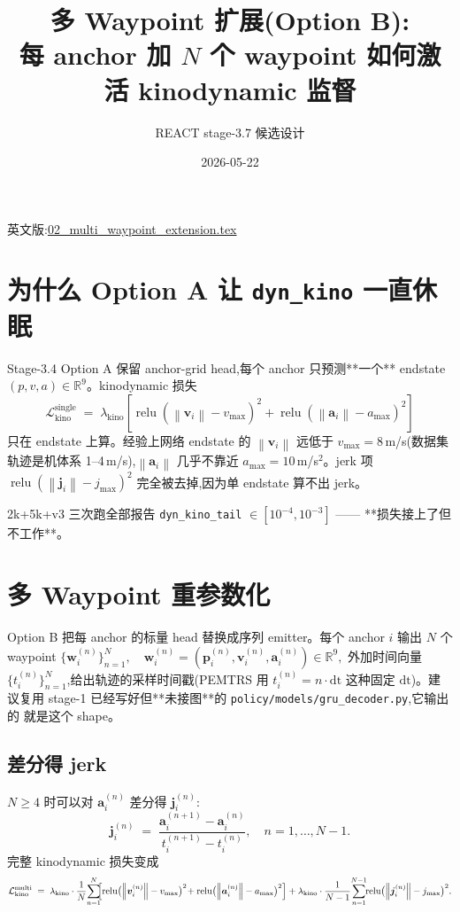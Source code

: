 \documentclass[UTF8, 11pt]{ctexart}
\title{多 Waypoint 扩展(Option B):\\
       每 anchor 加 $N$ 个 waypoint 如何激活 kinodynamic 监督}
\author{REACT stage-3.7 候选设计}
\date{2026-05-22}
\newcommand{\R}{\mathbb{R}}
\newcommand{\Norm}[1]{\left\lVert #1 \right\rVert}
\newcommand{\relu}{\operatorname{relu}}
\begin{document}
\maketitle

英文版:\href{run:./02_multi_waypoint_extension.tex}{02\_multi\_waypoint\_extension.tex}

\section{为什么 Option A 让 \texttt{dyn\_kino} 一直休眠}

Stage-3.4 Option A 保留 anchor-grid head,每个 anchor 只预测**一个** endstate
$(p, v, a) \in \R^9$。kinodynamic 损失
\begin{equation}\label{eq:kino-anchor}
\mathcal{L}_{\text{kino}}^{\text{single}}
\;=\; \lambda_{\text{kino}}\!\left[
   \relu(\Norm{\bm{v}_i} - v_{\max})^2 +
   \relu(\Norm{\bm{a}_i} - a_{\max})^2
\right]
\end{equation}
只在 endstate 上算。经验上网络 endstate 的 $\Norm{\bm{v}_i}$ 远低于
$v_{\max}=8\,$m/s(数据集轨迹是机体系 1--4\,m/s),$\Norm{\bm{a}_i}$
几乎不靠近 $a_{\max}=10\,$m/s$^2$。jerk 项 $\relu(\Norm{\bm{j}_i}-j_{\max})^2$
完全被去掉,因为单 endstate 算不出 jerk。

2k+5k+v3 三次跑全部报告 \texttt{dyn\_kino\_tail} $\in [10^{-4}, 10^{-3}]$ ——
**损失接上了但不工作**。

\section{多 Waypoint 重参数化}

Option B 把每 anchor 的标量 head 替换成序列 emitter。每个 anchor $i$
输出 $N$ 个 waypoint
\(
\{\bm{w}_i^{(n)}\}_{n=1}^{N},
\quad
\bm{w}_i^{(n)} = (\bm{p}_i^{(n)}, \bm{v}_i^{(n)}, \bm{a}_i^{(n)}) \in \R^9,
\)
外加时间向量 $\{t_i^{(n)}\}_{n=1}^N$,给出轨迹的采样时间戳(PEMTRS 用
$t_i^{(n)} = n \cdot \mathrm{dt}$ 这种固定 $\mathrm{dt}$)。建议复用 stage-1
已经写好但**未接图**的 \texttt{policy/models/gru\_decoder.py},它输出的
就是这个 shape。

\subsection{差分得 jerk}

$N \geq 4$ 时可以对 $\bm{a}_i^{(n)}$ 差分得 $\bm{j}_i^{(n)}$:
\begin{equation}
\bm{j}_i^{(n)}
\;=\;
\frac{\bm{a}_i^{(n+1)} - \bm{a}_i^{(n)}}{t_i^{(n+1)} - t_i^{(n)}},
\quad n = 1, \dots, N-1.
\end{equation}
完整 kinodynamic 损失变成
\begin{equation}\label{eq:kino-multi}
\mathcal{L}_{\text{kino}}^{\text{multi}}
\;=\;
\lambda_{\text{kino}}
\cdot
\frac{1}{N}\!\sum_{n=1}^{N}\!\!
\Bigl[
   \relu\bigl(\Norm{\bm{v}_i^{(n)}} - v_{\max}\bigr)^2 \!+
   \relu\bigl(\Norm{\bm{a}_i^{(n)}} - a_{\max}\bigr)^2
\Bigr]
+ \lambda_{\text{kino}} \cdot \frac{1}{N-1} \!\sum_{n=1}^{N-1}\!\!
   \relu\bigl(\Norm{\bm{j}_i^{(n)}} - j_{\max}\bigr)^2.
\end{equation}
\end{document}
